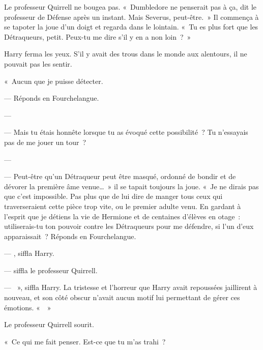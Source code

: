 Le professeur Quirrell ne bougea pas.
«~Dumbledore ne penserait pas à ça, dit le professeur de Défense après un instant.
Mais Severus, peut-être.~»
Il commença à se tapoter la joue d'un doigt et regarda dans le lointain.
«~Tu es plus fort que les Détraqueurs, petit.
Peux-tu me dire s'il y en a non loin~?~»

Harry ferma les yeux.
S'il y avait des trous dans le monde aux alentours, il ne pouvait pas les sentir.

«~Aucun que je puisse détecter.

--- Réponds en Fourchelangue.

--- 

--- Mais tu étais honnête lorsque tu as évoqué cette possibilité~?
Tu n'essayais pas de me jouer un tour~?

--- 

--- Peut-être qu'un Détraqueur peut être masqué, ordonné de bondir et de dévorer la première âme venue…~»
il se tapait toujours la joue.
«~Je ne dirais pas que c'est impossible.
Pas plus que de lui dire de manger tous ceux qui traverseraient cette pièce trop vite, ou le premier adulte venu.
En gardant à l'esprit que je détiens la vie de Hermione et de centaines d'élèves en otage~: utiliserais-tu ton pouvoir contre les Détraqueurs pour me défendre, si l'un d'eux apparaissait~?
Réponds en Fourchelangue.

--- , siffla Harry.

---  siffla le professeur Quirrell.

--- ~», siffla Harry.
La tristesse et l'horreur que Harry avait repoussées jaillirent à nouveau, et son côté obscur n'avait aucun motif lui permettant de gérer ces émotions.
«~~»

Le professeur Quirrell sourit.

«~Ce qui me fait penser.
Est-ce que tu m'as trahi~?

